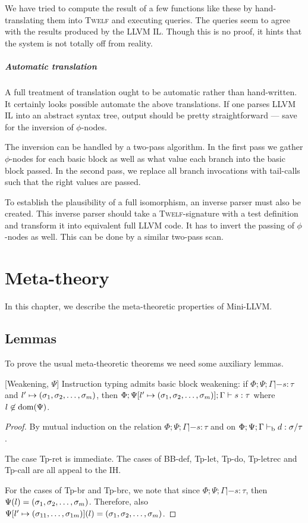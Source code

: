 \documentclass[a4paper, oneside, 10pt, draft]{memoir}
\newcommand{\twelf}{\textsc{Twelf}}
\begin{document}
We have tried to compute the result of a few functions like these by
hand-translating them into \twelf{} and executing queries. The queries
seem to agree with the results produced by the LLVM IL. Though this is
no proof, it hints that the system is not totally off from reality.

\paragraph{Automatic translation}

A full treatment of translation ought to be automatic rather than
hand-written. It certainly looks possible automate the above
translations. If one parses LLVM IL into an abstract syntax tree,
output should be pretty straightforward --- save for the inversion of
$\phi$-nodes.

The inversion can be handled by a two-pass algorithm. In the first
pass we gather $\phi$-nodes for each basic block as well as what value
each branch into the basic block passed. In the second pass, we
replace all branch invocations with tail-calls such that the right
values are passed.

To establish the plausibility of a full isomorphism, an inverse parser
must also be created. This inverse parser should take a
\twelf{}-signature with a test definition and transform it into
equivalent full LLVM code. It has to invert the passing of
$\phi$-nodes as well. This can be done by a similar two-pass scan.

\chapter{Meta-theory}

In this chapter, we describe the meta-theoretic properties of
Mini-LLVM.

\section{Lemmas}

To prove the usual meta-theoretic theorems we need some auxiliary
lemmas.

\begin{lem}{[Weakening, $\Psi$]}
  \label{lem:weaken-psi}
  Instruction typing admits basic block weakening: if $\Phi;\Psi;\Gamma
  |- s : \tau$ and $l' \mapsto (\sigma_1, \sigma_2, \dotsc, \sigma_m)$, then $\Phi;\Psi[l' \mapsto
  (\sigma_1, \sigma_2, \dotsc, \sigma_m)];\Gamma |- s : \tau$ where $l \not \in \mathrm{dom}(\Psi)$.
\end{lem}
\begin{proof}
  By mutual induction on the relation $\Phi;\Psi;\Gamma |- s : \tau$
  and on $\Phi;\Psi;\Gamma |-_{\mathrm{b}} d : \sigma / \tau$.

  The case Tp-ret is immediate. The cases of BB-def, Tp-let, Tp-do,
  Tp-letrec and Tp-call are all appeal to the IH.

  For the cases of Tp-br and Tp-brc, we note that since
  $\Phi;\Psi;\Gamma |- s : \tau$, then $\Psi(l) =
  (\sigma_1, \sigma_2, \dotsc, \sigma_m)$. Therefore, also $\Psi[l' \mapsto (\sigma_{11}, \dotsc,
  \sigma_{1m})](l) = (\sigma_1, \sigma_2, \dotsc, \sigma_m)$.
\end{proof}
\end{document}
